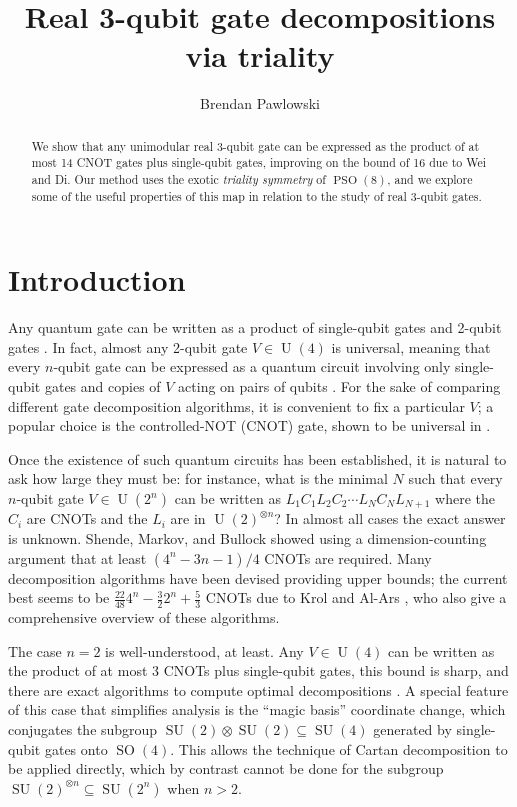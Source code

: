 \documentclass[reqno]{amsart}
\theoremstyle{definition} \newtheorem{example}[theorem]{Example}
\newcommand{\U}{\operatorname{U}}
\newcommand{\SU}{\operatorname{SU}}
\newcommand{\SO}{\operatorname{SO}}
\newcommand{\PSO}{\operatorname{PSO}}
\begin{document}
\title{Real 3-qubit gate decompositions via triality}
\author{Brendan Pawlowski}
\date{}



\begin{abstract} We show that any unimodular real 3-qubit gate can be expressed as the product of at most 14 CNOT gates plus single-qubit gates, improving on the bound of 16 due to Wei and Di. Our method uses the exotic \emph{triality symmetry} of $\PSO(8)$, and we explore some of the useful properties of this map in relation to the study of real 3-qubit gates.
\end{abstract}

\maketitle

\section{Introduction}

Any quantum gate can be written as a product of single-qubit gates and 2-qubit gates \cite{divincenzo-2q}. In fact, almost any 2-qubit gate $V \in \U(4)$ is universal, meaning that every $n$-qubit gate can be expressed as a quantum circuit involving only single-qubit gates and copies of $V$ acting on pairs of qubits \cite{2q-universal-1995, 2q-universal-lloyd}. For the sake of comparing different gate decomposition algorithms, it is convenient to fix a particular $V$; a popular choice is the controlled-NOT (CNOT) gate, shown to be universal in \cite{elementary-gates}.

Once the existence of such quantum circuits has been established, it is natural to ask how large they must be: for instance, what is the minimal $N$ such that every $n$-qubit gate $V \in \U(2^n)$ can be written as $L_1 C_1 L_2 C_2 \cdots L_N C_N L_{N+1}$ where the $C_i$ are CNOTs and the $L_i$ are in $\U(2)^{\otimes n}$? In almost all cases the exact answer is unknown. Shende, Markov, and Bullock \cite{shende-markov-bullock} showed using a dimension-counting argument that at least $(4^n-3n-1)/4$ CNOTs are required. Many decomposition algorithms have been devised providing upper bounds; the current best seems to be $\tfrac{22}{48} 4^n - \tfrac{3}{2} 2^n + \tfrac{5}{3}$ CNOTs due to Krol and Al-Ars \cite{block-ZXZ}, who also give a comprehensive overview of these algorithms.

The case $n=2$ is well-understood, at least. Any $V \in \U(4)$ can be written as the product of at most 3 CNOTs plus single-qubit gates, this bound is sharp, and there are exact algorithms to compute optimal decompositions \cite{2q-optimal}. A special feature of this case that simplifies analysis is the ``magic basis'' coordinate change, which conjugates the subgroup $\SU(2) \otimes \SU(2) \subseteq \SU(4)$ generated by single-qubit gates onto $\SO(4)$. This allows the technique of Cartan decomposition to be applied directly, which by contrast cannot be done for the subgroup $\SU(2)^{\otimes n} \subseteq \SU(2^n)$ when $n > 2$.
\end{document}
